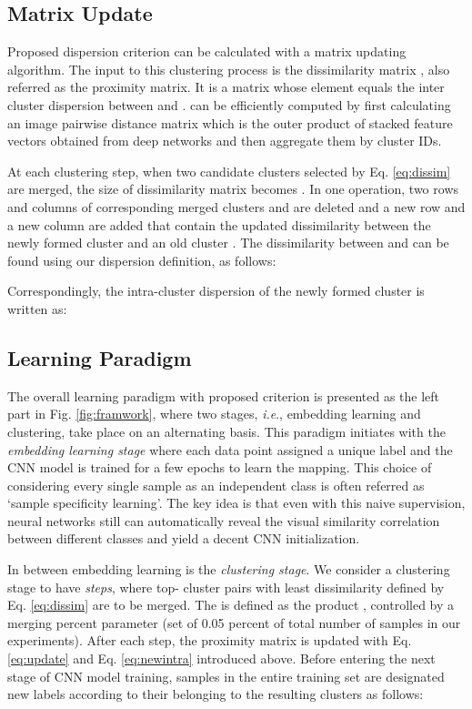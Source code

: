 \documentclass[journal]{IEEEtran}
\newcommand{\ie}{\textit{i.e}.}
\begin{document}
\subsection{Matrix Update}
Proposed dispersion criterion can be calculated with a matrix updating algorithm. The input to this clustering process is the dissimilarity matrix , also referred as the proximity matrix. It is a  matrix whose  element equals the inter cluster dispersion  between  and .  can be efficiently computed by first calculating an image pairwise distance matrix which is the outer product of stacked feature vectors obtained from deep networks and then aggregate them by cluster IDs.

At each clustering step, when two candidate clusters selected by Eq. \eqref{eq:dissim} are merged, the size of dissimilarity matrix  becomes . In one operation, two rows and columns of corresponding merged clusters  and  are deleted and a new row and a new column are added that contain the updated dissimilarity between the newly formed cluster  and an old cluster . The dissimilarity between  and  can be found using our dispersion definition, as follows:

Correspondingly, the intra-cluster dispersion of the newly formed cluster  is written as:



\subsection{Learning Paradigm}
\label{subsec:update}
The overall learning paradigm with proposed criterion is presented as the left part in Fig. \ref{fig:framwork}, where two stages, \ie, embedding learning and clustering, take place on an alternating basis. This paradigm initiates with the {\em embedding learning stage} where each data point  assigned a unique label  and the CNN model is trained for a few epochs to learn the mapping. This choice of considering every single sample as an independent class is often referred as `sample specificity learning'. The key idea is that even with this naive supervision, neural networks still can automatically reveal the visual similarity correlation between different classes and yield a decent CNN initialization. 

In between embedding learning is the {\em clustering stage}. We consider a clustering stage to have  {\em steps}, where top- cluster pairs with least dissimilarity defined by Eq. \eqref{eq:dissim} are to be merged. The  is defined as the product , controlled by a merging percent parameter  (set of 0.05 percent of total number of samples in our experiments). After each step, the proximity matrix  is updated with Eq. \eqref{eq:update} and Eq. \eqref{eq:newintra} introduced above. Before entering the next stage of CNN model training, samples in the entire training set are designated new labels according to their belonging to the resulting clusters as follows:
\end{document}

